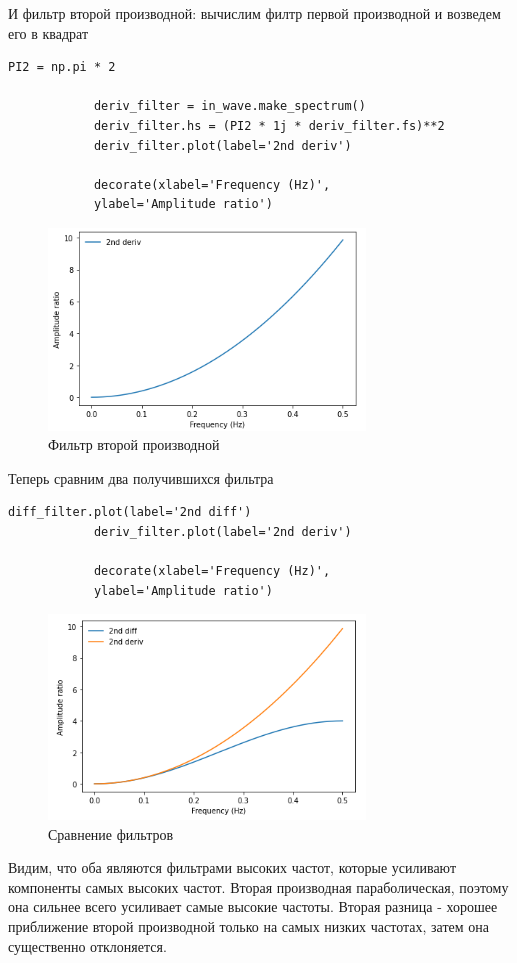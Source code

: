 \documentclass[a4paper,12pt]{article}
\begin{document}
\begin{enumerate}
		И фильтр второй производной: вычислим филтр первой производной и возведем его в квадрат
		\begin{lstlisting}[caption=Фильтр второй производной]
			PI2 = np.pi * 2
			
			deriv_filter = in_wave.make_spectrum()
			deriv_filter.hs = (PI2 * 1j * deriv_filter.fs)**2
			deriv_filter.plot(label='2nd deriv')
			
			decorate(xlabel='Frequency (Hz)',
			ylabel='Amplitude ratio')
		\end{lstlisting}
		\begin{figure}[H]
			\centering
			\includegraphics[width=0.75\textwidth]{5_6.png}
			\caption{Фильтр второй производной}
			\label{fig:5.6}
		\end{figure}
		
		Теперь сравним два получившихся фильтра
		\begin{lstlisting}[caption=Сравнение фильтров]
			diff_filter.plot(label='2nd diff')
			deriv_filter.plot(label='2nd deriv')
			
			decorate(xlabel='Frequency (Hz)',
			ylabel='Amplitude ratio')
		\end{lstlisting}
		\begin{figure}[H]
			\centering
			\includegraphics[width=0.75\textwidth]{5_7.png}
			\caption{Сравнение фильтров}
			\label{fig:5.7}
		\end{figure}
		
	
		Видим, что оба являются фильтрами высоких частот, которые усиливают компоненты самых высоких частот. Вторая производная параболическая, поэтому она сильнее всего усиливает самые высокие частоты. Вторая разница - хорошее приближение второй производной только на самых низких частотах, затем она существенно отклоняется.
		
	\end{enumerate}
	\newpage
	
\end{document}
